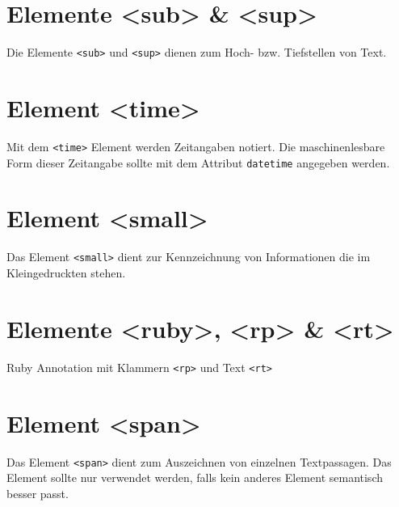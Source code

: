 \section{Elemente <sub> \& <sup>}
Die Elemente \texttt{<sub>} und \texttt{<sup>} dienen zum Hoch- bzw. Tiefstellen von Text.
\section{Element <time>}
Mit dem \texttt{<time>} Element werden Zeitangaben notiert. Die maschinenlesbare Form dieser Zeitangabe sollte mit dem Attribut \texttt{datetime} angegeben werden.
\section{Element <small>}
Das Element \texttt{<small>} dient zur Kennzeichnung von Informationen die im Kleingedruckten stehen.
\section{Elemente <ruby>, <rp> \& <rt>}
Ruby Annotation mit Klammern \texttt{<rp>} und Text \texttt{<rt>}
\section{Element <span>}
Das Element \texttt{<span>} dient zum Auszeichnen von einzelnen Textpassagen. Das Element sollte nur verwendet werden, falls kein anderes Element semantisch besser passt.